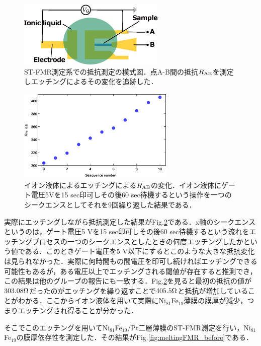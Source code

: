\begin{figure}[htbp]
\centerline{
\includegraphics[width=7cm]{images/IL_resi_setup.eps}
}
\caption{ST-FMR測定系での抵抗測定の模式図．点A-B間の抵抗$R_{\rm AB}$を測定しエッチングによるその変化を追跡した．
}
\label{fig:IL_resi_setup} 
\end{figure}



\begin{figure}[htbp]
\centerline{
\includegraphics[width=7.5cm]{images/resichange_before.eps}
}
\caption{イオン液体によるエッチングによる$R_{\rm AB}$の変化．イオン液体にゲート電圧5Vを15 sec印可しその後60 sec待機するという操作を一つのシークエンスとしてそれを9回繰り返した結果である．
}
\label{fig:resichange_before} 
\end{figure}

実際にエッチングしながら抵抗測定した結果がFig.\ref{fig:resichange_before}である．x軸のシークエンスというのは，ゲート電圧5 Vを15 sec印可しその後60 sec待機するという流れをエッチングプロセスの一つのシークエンスとしたときの何度エッチングしたかという値である．このときゲート電圧を5 V以下にするとこのような大きな抵抗変化は見られなかった．実際に何時間もの間電圧を印可し続ければエッチングできる可能性もあるが，ある電圧以上でエッチングされる閾値が存在すると推測でき，この結果は他のグループの報告にも一致する．Fig.\ref{fig:resichange_before}を見ると最初の抵抗の値が$303.08\rm \Omega$だったのがエッチングを繰り返すことで$405.5\rm \Omega$と抵抗が増加していることがわかる．ここからイオン液体を用いて実際にNi$_{81}$Fe$_{19}$薄膜の膜厚が減少，つまりエッチングされ得ることが分かった．

そこでこのエッチングを用いてNi$_{81}$Fe$_{19}$/Pt二層薄膜のST-FMR測定を行い，Ni$_{81}$Fe$_{19}$の膜厚依存性を測定した．その結果がFig.\ref{fig:meltingFMR_before}である．

